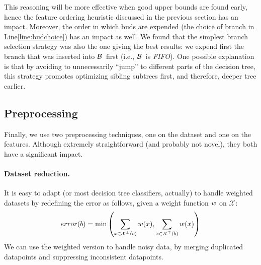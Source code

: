 \documentclass{llncs}
\newcommand{\setex}[1]{\ensuremath{{\mathcal X}^{#1}}\xspace}
\newcommand{\posex}{{\setex{\top}}\xspace}
\newcommand{\negex}{{\setex{\bot}}\xspace}
\newcommand{\allex}{{\setex{}}\xspace}
\newcommand{\bud}[0]{\ensuremath{{\cal B}}}
\newcommand{\afeat}[0]{\ensuremath{f}}
\newcommand{\weight}[1][]{\ensuremath{\ifthenelse{\equal{#1}{}}{w}{w({#1})}}}
\newcommand{\error}[1][]{\ensuremath{\ifthenelse{\equal{#1}{}}{{error}}{{error({{#1}})}}}}
\newcommand{\abranch}[0]{\ensuremath{b}}
\newcommand{\numex}[0]{\ensuremath{n}}
\newcommand{\numfeat}[0]{\ensuremath{m}}
\newcommand{\mdepth}[0]{\ensuremath{k}}
\begin{document}
\medskip

This reasoning will be more effective when good upper bounds are found early, hence the feature ordering heuristic discussed in the previous section has an impact. Moreover, the order in which buds are expended (the choice of branch in Line\ref{line:budchoice}) has an impact as well. We found that the simplest branch selection strategy was also the one giving the best results: we expend first the branch that was inserted into \bud\ first (i.e., \bud\ is \emph{FIFO}). One possible explanation is that by avoiding to unnecessarily ``jump'' to different parts of the decision tree, this strategy promotes optimizing sibling subtrees first, and therefore, deeper tree earlier.





















\subsection{Preprocessing}
\label{sec:preprocessing}

Finally, we use two preprocessing techniques, one on the dataset and one on the features. Although extremely straightforward (and probably not novel), they both have a significant impact.

\paragraph{Dataset reduction.}
It is easy to adapt \budalg (or most decision tree classifiers, actually) to handle weighted datasets by redefining the error as follows, given a weight function $\weight$ on $\allex$:
$$
\error[\abranch] = \min\left( \sum\limits_{x \in \negex(\abranch)}\weight[x], \sum\limits_{x \in \posex(\abranch)}\weight[x] \right)
$$
We can use the weighted version to handle noisy data, by merging duplicated datapoints and suppressing inconsistent datapoints.
\end{document}
